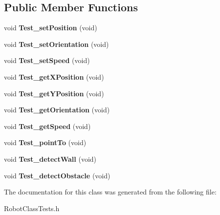 \subsection*{Public Member Functions}
\begin{DoxyCompactItemize}
\item 
\hypertarget{classRobotClassTests_aba9aecc23ec856d65fa74d5d3cea10a8}{void {\bfseries Test\-\_\-set\-Position} (void)}\label{classRobotClassTests_aba9aecc23ec856d65fa74d5d3cea10a8}

\item 
\hypertarget{classRobotClassTests_a33264481e9d920743ce34d9ef4aa660f}{void {\bfseries Test\-\_\-set\-Orientation} (void)}\label{classRobotClassTests_a33264481e9d920743ce34d9ef4aa660f}

\item 
\hypertarget{classRobotClassTests_ae1b1908a1049658f46f432d894834be6}{void {\bfseries Test\-\_\-set\-Speed} (void)}\label{classRobotClassTests_ae1b1908a1049658f46f432d894834be6}

\item 
\hypertarget{classRobotClassTests_a895a241248e40a1d09e7bea6fa383fc5}{void {\bfseries Test\-\_\-get\-X\-Position} (void)}\label{classRobotClassTests_a895a241248e40a1d09e7bea6fa383fc5}

\item 
\hypertarget{classRobotClassTests_aefebbc51a747be6baaf82c07809ed770}{void {\bfseries Test\-\_\-get\-Y\-Position} (void)}\label{classRobotClassTests_aefebbc51a747be6baaf82c07809ed770}

\item 
\hypertarget{classRobotClassTests_acc2380b2c39db28b95249a79668c813a}{void {\bfseries Test\-\_\-get\-Orientation} (void)}\label{classRobotClassTests_acc2380b2c39db28b95249a79668c813a}

\item 
\hypertarget{classRobotClassTests_a8114711c0aee66fc012c25047e1b9da2}{void {\bfseries Test\-\_\-get\-Speed} (void)}\label{classRobotClassTests_a8114711c0aee66fc012c25047e1b9da2}

\item 
\hypertarget{classRobotClassTests_ae386691eec91f33f2474ac4b4cf994fc}{void {\bfseries Test\-\_\-point\-To} (void)}\label{classRobotClassTests_ae386691eec91f33f2474ac4b4cf994fc}

\item 
\hypertarget{classRobotClassTests_a589f51113f4f05c0d8073f60332fa02d}{void {\bfseries Test\-\_\-detect\-Wall} (void)}\label{classRobotClassTests_a589f51113f4f05c0d8073f60332fa02d}

\item 
\hypertarget{classRobotClassTests_a1b0ca0bfbe59f04cc5cb6be811bd56e1}{void {\bfseries Test\-\_\-detect\-Obstacle} (void)}\label{classRobotClassTests_a1b0ca0bfbe59f04cc5cb6be811bd56e1}

\end{DoxyCompactItemize}


The documentation for this class was generated from the following file\-:\begin{DoxyCompactItemize}
\item 
Robot\-Class\-Tests.\-h\end{DoxyCompactItemize}
